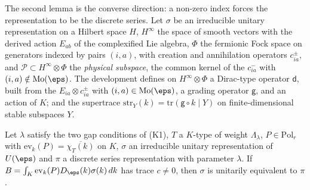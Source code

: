 The second lemma is the converse direction: a non-zero index forces the representation to be the discrete series. Let
$\sigma$ be an irreducible unitary representation on a Hilbert space $H$, $H^\infty$ the space of smooth vectors with the
derived action $E_{ab}$ of the complexified Lie algebra, $\Phi$ the fermionic Fock space on generators indexed by pairs
$(i,a)$, with creation and annihilation operators $c^\pm_{ia}$, and $\mathcal P\subset H^\infty\otimes\Phi$ the
\emph{physical subspace}, the common kernel of the $c^-_{ia}$ with $(i,a)\notin\mathrm{Mo}(\eps)$. The development defines
on $H^\infty\otimes\Phi$ a Dirac-type operator $\mathsf d$, built from the $E_{ia}\otimes c^\pm_{ia}$ with
$(i,a)\in\mathrm{Mo}(\eps)$, a grading operator $\mathsf g$, and an action of $K$; and the supertrace
$\mathrm{str}_Y(k)=\mathrm{tr}(\mathsf g\circ k\mid Y)$ on finite-dimensional stable subspaces $Y$.

\begin{lemma}\label{pf:multnc:equiv}
Let $\lambda$ satisfy the two gap conditions of (K1), $T$ a $K$-type of weight $\Lambda_\lambda$, $P\in\mathrm{Pol}_r$ with
$\mathrm{ev}_k(P)=\overline{\chi_T(k)}$ on $K$, $\sigma$ an irreducible unitary representation of $U(\eps)$ and $\pi$ a
discrete series representation with parameter $\lambda$. If $B=\int_K\mathrm{ev}_k(P)D_\eps(k)\sigma(k)\,dk$ has trace
$c\ne0$, then $\sigma$ is unitarily equivalent to $\pi$.
\end{lemma}

